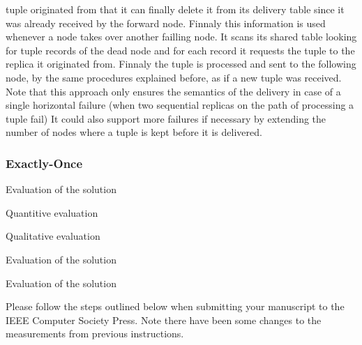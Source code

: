 \documentclass[times, 10pt,twocolumn]{article}
\begin{document}
tuple originated from that it can finally delete it from its delivery table
since it was already received by the forward node. Finnaly this information is
used whenever a node takes over another failling node. It scans its shared
table looking for tuple records of the dead node and for each record it
requests the tuple to the replica it originated from.  Finnaly the tuple is
processed and sent to the following node, by the same procedures explained
before, as if a new tuple was received. Note that this approach only
ensures the semantics of the delivery in case of a single horizontal
failure (when two sequential replicas on the path of processing a tuple
fail) It could also support more failures if necessary by extending the
number of nodes where a tuple is kept before it is delivered.


\subsubsection{Exactly-Once}


Evaluation of the solution


Quantitive evaluation


Qualitative evaluation


Evaluation of the solution


Evaluation of the solution


Please follow the steps outlined below when submitting your manuscript to
the IEEE Computer Society Press. Note there have been some changes to the
measurements from previous instructions. 

\end{document}
